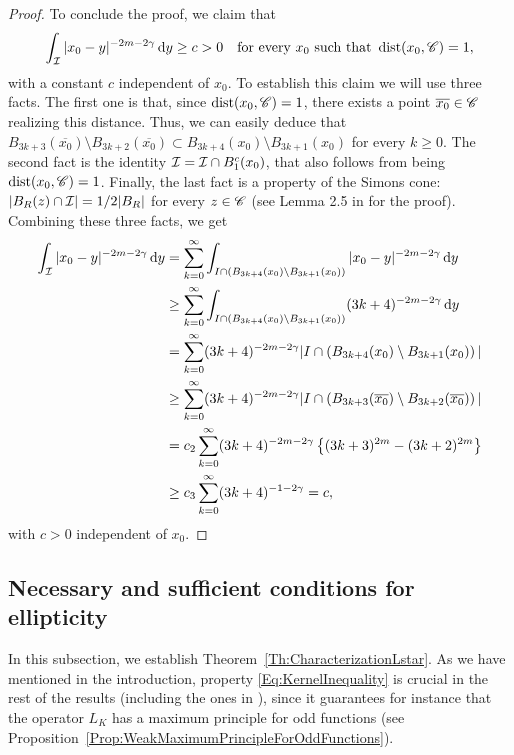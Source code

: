 \begin{proof}
	To conclude the proof, we claim that
	$$ \int_{\mathcal{I}} |x_0-y|^{-2m-2\gamma} \,\mathrm{d} y \geq c>0\quad \textrm{for every } x_0 \textrm{ such that } \operatorname{dist}(x_0,\mathscr{C}) = 1,$$
	with a constant $c$ independent of $x_0$. To establish this claim we will use three facts. The first one is that, since $\operatorname{dist}(x_0,\mathscr{C}) = 1$, there exists a point $\overline{x_0}\in \mathscr{C}$ realizing this distance. Thus, we can easily deduce that $B_{3k+3}(\overline{x_0}) \setminus B_{3k+2}(\overline{x_0}) \subset  B_{3k+4}(x_0)\setminus B_{3k+1}(x_0)$ for every $k\geq 0$. The second fact is the identity $\mathcal{I} = \mathcal{I} \cap B_1^c(x_0)$, that also follows from being $\operatorname{dist}(x_0,\mathscr{C}) = 1$. Finally, the last fact is a property of the Simons cone: $|B_R(z) \cap \mathcal{I}| = 1/2 |B_R|$ for every $z\in \mathscr{C}$ (see Lemma 2.5 in \cite{Felipe-Sanz-Perela:SaddleFractional} for the proof). Combining these three facts, we get
	\begin{align*}
	\int_{\mathcal{I}} |x_0-y|^{-2m-2\gamma} \,\mathrm{d} y &= \sum_{k=0}^\infty \int_{I\cap \left( B_{3k+4}(x_0)\setminus B_{3k+1}(x_0)\right)} |x_0-y|^{-2m-2\gamma} \,\mathrm{d} y\\
	&\geq \sum_{k=0}^\infty \int_{I\cap \left( B_{3k+4}(x_0)\setminus B_{3k+1}(x_0)\right)} (3k+4)^{-2m-2\gamma} \,\mathrm{d} y \\
	&= \sum_{k=0}^\infty (3k+4)^{-2m-2\gamma} |I\cap \left( B_{3k+4}(x_0)\setminus B_{3k+1}(x_0)\right)|\\
	&\geq \sum_{k=0}^\infty (3k+4)^{-2m-2\gamma} |I\cap \left( B_{3k+3}(\overline{x_0}) \setminus B_{3k+2}(\overline{x_0}) \right)|\\
	&= c_2 \sum_{k=0}^\infty (3k+4)^{-2m-2\gamma} \left\{(3k+3)^{2m} -(3k+2)^{2m}\right\}\\
	&\geq c_3 \sum_{k=0}^\infty (3k+4)^{-1-2\gamma} = c,
	\end{align*}
	with $c>0$ independent of $x_0$.
\end{proof}

\subsection{Necessary and sufficient conditions for ellipticity}

In this subsection, we establish Theorem~\ref{Th:CharacterizationLstar}. As we have mentioned in the introduction, property \eqref{Eq:KernelInequality} is crucial in the rest of the results (including the ones in \cite{FelipeSanz-Perela:IntegroDifferentialII}), since it guarantees for instance that the operator $L_K$ has a maximum principle for odd functions (see Proposition~\ref{Prop:WeakMaximumPrincipleForOddFunctions}).

